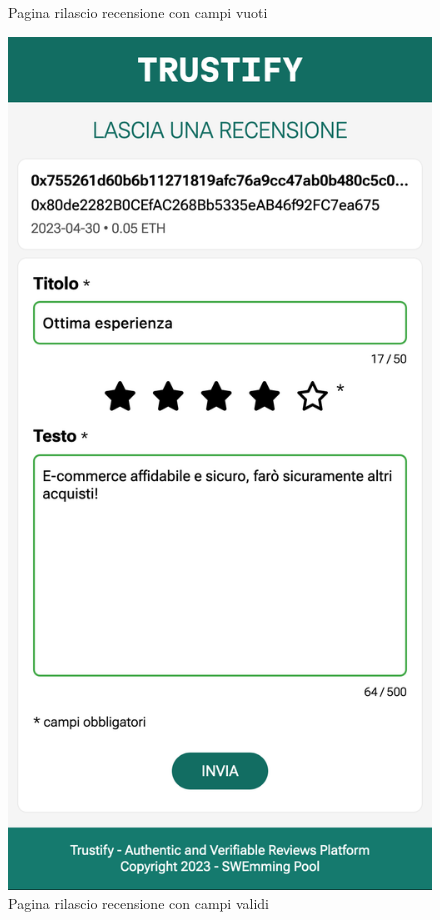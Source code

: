 \begin{figure}
      \caption{Pagina rilascio recensione con campi vuoti}\label{fig:rilascio_recensione}
    \endminipage\hfill
      \includegraphics[width=\linewidth]{src/img/rilascio_recensione_valid.png}
      \caption{Pagina rilascio recensione con campi validi}\label{fig:rilascio_recensione_valid}
    \endminipage\hfill
\end{figure}


